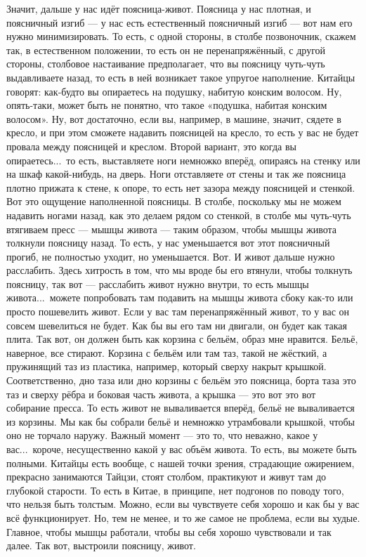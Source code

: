 Значит, дальше у нас идёт поясница-живот. Поясница у нас плотная, и поясничный изгиб --- у нас
есть естественный поясничный изгиб --- вот нам его нужно минимизировать. То есть, с одной стороны,
в столбе позвоночник, скажем так, в естественном положении, то есть он не перенапряжённый, с
другой стороны, столбовое настаивание предполагает, что вы поясницу чуть-чуть выдавливаете
назад, то есть в ней возникает такое упругое наполнение. Китайцы говорят: как-будто вы опираетесь
на
подушку, набитую конским волосом. Ну, опять-таки, может быть не понятно, что такое «подушка,
набитая конским волосом». Ну, вот достаточно, если вы, например, в машине, значит, сядете в
кресло, и при этом сможете надавить поясницей на кресло, то есть у вас не будет
провала между поясницей и креслом. Второй
вариант, это когда вы опираетесь...\ то есть, выставляете ноги немножко вперёд, опираясь на стенку
или на шкаф какой-нибудь, на дверь. Ноги отставляете от стены и так же поясница плотно прижата к
стене, к опоре, то есть нет зазора между поясницей и стенкой. Вот это ощущение наполненной
поясницы. В столбе, поскольку мы не можем надавить ногами назад, как это делаем рядом со
стенкой, в столбе мы чуть-чуть втягиваем пресс --- мышцы живота --- таким образом, чтобы мышцы
живота толкнули поясницу назад. То есть, у нас уменьшается вот этот поясничный прогиб, не полностью
уходит, но уменьшается. Вот. И живот дальше нужно расслабить. Здесь хитрость в том, что мы
вроде бы его втянули, чтобы толкнуть поясницу, так вот --- расслабить живот нужно внутри,
то есть мышцы
живота...\ можете попробовать там подавить на мышцы живота сбоку как-то или просто пошевелить
живот. Если у вас там перенапряжённый живот, то у вас он совсем шевелиться не будет. Как бы вы его
там ни двигали, он будет как такая плита. Так вот, он должен быть как корзина с бельём, образ мне
нравится. Бельё, наверное, все стирают. Корзина с бельём или там таз, такой не жёсткий, а
пружинящий таз из пластика, например, который сверху накрыт крышкой. Соответственно, дно таза
или дно корзины с бельём это поясница, борта таза это таз и сверху рёбра и боковая часть
живота, а крышка --- это вот это вот собирание пресса. То есть живот не вываливается вперёд,
бельё не вываливается из корзины. Мы как бы собрали бельё и немножко утрамбовали крышкой, чтобы
оно не торчало наружу. Важный момент --- это то, что неважно, какое у вас...\ короче,
несущественно какой у вас объём живота. То есть, вы можете быть полными. Китайцы есть вообще, с
нашей точки зрения, страдающие ожирением, прекрасно занимаются Тайцзи, стоят столбом,
практикуют и живут там до глубокой старости. То есть в Китае, в принципе, нет подгонов по
поводу того, что нельзя быть толстым. Можно, если вы чувствуете себя хорошо и как бы у вас всё
функционирует. Но, тем не менее, и то же самое не проблема, если вы худые. Главное, чтобы мышцы
работали, чтобы вы себя хорошо чувствовали и так далее. Так вот, выстроили поясницу, живот.

